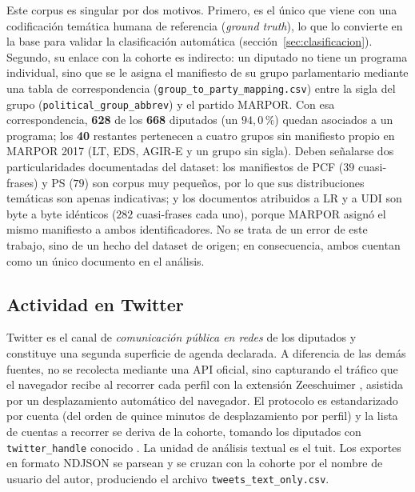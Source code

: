 Este corpus es singular por dos motivos. Primero, es el único que viene con una
codificación temática humana de referencia (\emph{ground truth}), lo que lo
convierte en la base para validar la clasificación automática
(sección~\ref{sec:clasificacion}). Segundo, su enlace con la cohorte es
indirecto: un diputado no tiene un programa individual, sino que se le asigna el
manifiesto de su grupo parlamentario mediante una tabla de correspondencia
(\texttt{group\_to\_party\_mapping.csv}) entre la sigla del grupo
(\texttt{political\_group\_abbrev}) y el partido MARPOR. Con esa correspondencia,
\textbf{628} de los \textbf{668} diputados (un $94{,}0\,\%$) quedan asociados a
un programa; los \textbf{40} restantes pertenecen a cuatro grupos sin manifiesto
propio en MARPOR 2017 (LT, EDS, AGIR-E y un grupo sin sigla). Deben señalarse
dos particularidades documentadas del dataset: los manifiestos de PCF ($39$
cuasi-frases) y PS ($79$) son corpus muy pequeños, por lo que sus distribuciones
temáticas son apenas indicativas; y los documentos atribuidos a LR y a UDI son
byte a byte idénticos ($282$ cuasi-frases cada uno), porque MARPOR asignó el
mismo manifiesto a ambos identificadores. No se trata de un error de este
trabajo, sino de un hecho del dataset de origen; en consecuencia, ambos cuentan
como un único documento en el análisis.

\subsection{Actividad en Twitter}
\label{sec:corpus-twitter}

Twitter es el canal de \emph{comunicación pública en redes} de los diputados y
constituye una segunda superficie de agenda declarada. A diferencia de las demás
fuentes, no se recolecta mediante una API oficial, sino capturando el tráfico que
el navegador recibe al recorrer cada perfil con la extensión Zeeschuimer
\cite{peeters2022zeeschuimer}, asistida por un desplazamiento automático del
navegador. %
El protocolo es estandarizado por cuenta (del orden de quince minutos de
desplazamiento por perfil) y la lista de cuentas a recorrer se deriva de la
cohorte, tomando los diputados con \texttt{twitter\_handle} conocido
\cite{regardscitoyens_twitter}. La unidad de análisis textual es el tuit. Los
exportes en formato NDJSON se parsean y se cruzan con la cohorte por el nombre de
usuario del autor, produciendo el archivo \texttt{tweets\_text\_only.csv}.

